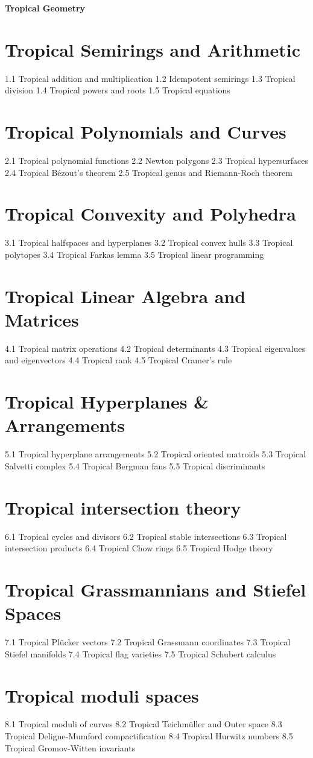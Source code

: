 {\LARGE \bf{Tropical Geometry}}
\section{Tropical Semirings and Arithmetic}
1.1 Tropical addition and multiplication
1.2 Idempotent semirings
1.3 Tropical division
1.4 Tropical powers and roots
1.5 Tropical equations
\section{Tropical Polynomials and Curves}
2.1 Tropical polynomial functions
2.2 Newton polygons
2.3 Tropical hypersurfaces
2.4 Tropical Bézout's theorem
2.5 Tropical genus and Riemann-Roch theorem
\section{Tropical Convexity and Polyhedra}
3.1 Tropical halfspaces and hyperplanes
3.2 Tropical convex hulls
3.3 Tropical polytopes
3.4 Tropical Farkas lemma
3.5 Tropical linear programming
\section{Tropical Linear Algebra and Matrices}
4.1 Tropical matrix operations
4.2 Tropical determinants
4.3 Tropical eigenvalues and eigenvectors
4.4 Tropical rank
4.5 Tropical Cramer's rule
\section{Tropical Hyperplanes \& Arrangements}
5.1 Tropical hyperplane arrangements
5.2 Tropical oriented matroids
5.3 Tropical Salvetti complex
5.4 Tropical Bergman fans
5.5 Tropical discriminants
\section{Tropical intersection theory}
6.1 Tropical cycles and divisors
6.2 Tropical stable intersections
6.3 Tropical intersection products
6.4 Tropical Chow rings
6.5 Tropical Hodge theory
\section{Tropical Grassmannians and Stiefel Spaces}
7.1 Tropical Plücker vectors
7.2 Tropical Grassmann coordinates
7.3 Tropical Stiefel manifolds
7.4 Tropical flag varieties
7.5 Tropical Schubert calculus
\section{Tropical moduli spaces}
8.1 Tropical moduli of curves
8.2 Tropical Teichmüller and Outer space
8.3 Tropical Deligne-Mumford compactification
8.4 Tropical Hurwitz numbers
8.5 Tropical Gromov-Witten invariants

